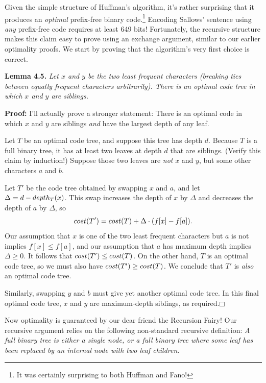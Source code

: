 Given the simple structure of Huffman’s algorithm, it’s rather surprising that it produces an \textit{optimal} prefix-free binary code.\footnote{It was certainly surprising to both Huffman and Fano!}
Encoding Sallows’ sentence using \textit{any} prefix-free code requires at least 649 bits!
Fortunately, the recursive structure makes this claim easy to prove using an exchange argument, similar to our earlier optimality proofs.
We start by proving that the algorithm’s very first choice is correct.

\noindent\textbf{Lemma 4.5.} \textsl{Let $x$ and $y$ be the two least frequent characters (breaking ties between equally frequent characters arbitrarily). There is an optimal code tree in which $x$ and $y$ are siblings.}

\noindent\textbf{Proof:} I’ll actually prove a stronger statement: There is an optimal code in which $x$ and $y$ are siblings \textit{and} have the largest depth of any leaf.

Let $T$ be an optimal code tree, and suppose this tree has depth $d$.
Because $T$ is a full binary tree, it has at least two leaves at depth $d$ that are siblings.
(Verify this claim by induction!)
Suppose those two leaves are \textit{not} $x$ and $y$, but some other characters $a$ and $b$.

Let $T'$ be the code tree obtained by swapping $x$ and $a$, and let $\Delta = d - depth_T(x)$.
This swap increases the depth of $x$ by $\Delta$ and decreases the depth of $a$ by $\Delta$, so
\[
cost(T') = cost(T) + \Delta \cdot (f[x] - f[a]).
\]
Our assumption that $x$ is one of the two least frequent characters but $a$ is not implies $f[x] \le f[a]$, and our assumption that $a$ has maximum depth implies $\Delta \ge 0$.
It follows that $cost(T') \le cost(T)$.
On the other hand, $T$ is an optimal code tree, so we must also have $cost(T') \ge cost(T)$.
We conclude that $T'$ is \textit{also} an optimal code tree.

Similarly, swapping $y$ and $b$ must give yet another optimal code tree.
In this final optimal code tree, $x$ and $y$ are maximum-depth siblings, as required.\hfill$\mdlgwhtsquare$

Now optimality is guaranteed by our dear friend the Recursion Fairy!
Our recursive argument relies on the following non-standard recursive definition:
\textit{A full binary tree is either a single node, or a full binary tree where some leaf has been replaced by an internal node with two leaf children.}

